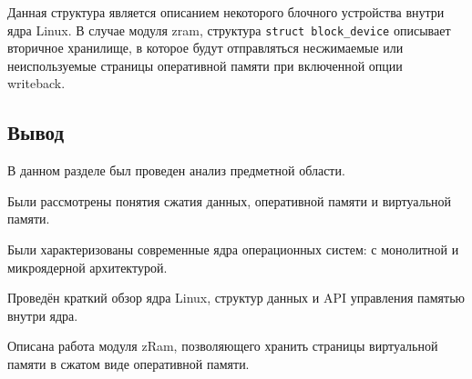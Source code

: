 Данная структура является описанием некоторого блочного устройства внутри ядра Linux. В случае модуля zram, структура \texttt{struct block\_device} описывает вторичное хранилище, в которое будут отправляться несжимаемые или неиспользуемые страницы оперативной памяти при включенной опции\\ writeback.


\subsection{Вывод}

В данном разделе был проведен анализ предметной области. 

Были рассмотрены понятия сжатия данных, оперативной памяти и виртуальной памяти. 

Были характеризованы современные ядра операционных систем: с монолитной и микроядерной архитектурой. 

Проведён краткий обзор ядра Linux, структур данных и API управления памятью внутри ядра.

Описана работа модуля zRam, позволяющего хранить страницы виртуальной памяти в сжатом виде оперативной памяти.

\pagebreak
